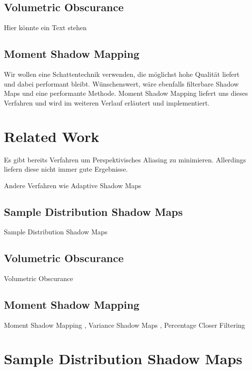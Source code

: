 \documentclass[runningheaders,a4paper]{llncs}
\begin{document}
\subsection{Volumetric Obscurance}
Hier könnte ein Text stehen


\subsection{Moment Shadow Mapping}
Wir wollen eine Schattentechnik verwenden, die möglichst hohe Qualität liefert und dabei performant bleibt. Wünschenswert, wäre ebenfalls filterbare Shadow Maps und eine performante Methode. Moment Shadow Mapping liefert uns dieses Verfahren und wird im weiteren Verlauf erläutert und implementiert.



\section{Related Work}

Es gibt bereits Verfahren \cite{csm} \cite{pssm} um Perspektivisches Aliasing zu minimieren.
Allerdings liefern diese nicht immer gute Ergebnisse.

Andere Verfahren wie Adaptive Shadow Maps \cite{asm}


\subsection{Sample Distribution Shadow Maps}

Sample Distribution Shadow Maps \cite{sdsm}


\subsection{Volumetric Obscurance}

Volumetric Obscurance \cite{loos2010volumetric}


\subsection{Moment Shadow Mapping}

Moment Shadow Mapping \cite{msm}, Variance Shadow Maps \cite{donnelly2006variance}, Percentage Closer Filtering \cite{reeves1987rendering}



\section{Sample Distribution Shadow Maps}
\end{document}
